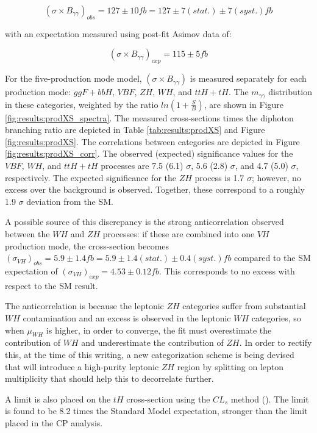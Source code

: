 \begin{equation}
(\sigma \times B_{\gamma \gamma})_{obs} =127 \pm 10 fb=127 \pm 7(stat.) \pm 7(syst.)fb
\end{equation}

with an expectation measured using post-fit Asimov data of:

\begin{equation}
(\sigma \times B_{\gamma \gamma})_{exp} =115 \pm 5 fb
\end{equation}

For the five-production mode model, $(\sigma \times B_{\gamma \gamma})$ is measured separately for each production mode: $ggF+bbH$, $VBF$, $ZH$, $WH$, and $ttH+tH$. The $m_{\gamma\gamma}$ distribution in these categories, weighted by the ratio $ln(1+\frac{S}{B})$, are shown in Figure \ref{fig:results:prodXS_spectra}. The measured cross-sections times the diphoton branching ratio are depicted in Table \ref{tab:results:prodXS} and Figure \ref{fig:results:prodXS}. The correlations between categories are depicted in Figure \ref{fig:results:prodXS_corr}. The observed (expected) significance values for the $VBF$, $WH$, and $ttH+tH$ processes are 7.5 (6.1) $\sigma$, 5.6 (2.8) $\sigma$, and 4.7 (5.0) $\sigma$, respectively. The expected significance for the $ZH$ process is 1.7 $\sigma$; however, no excess over the background is observed. Together, these correspond to a roughly 1.9 $\sigma$ deviation from the SM.

A possible source of this discrepancy is the strong anticorrelation observed between the $WH$ and $ZH$ processes: if these are combined into one $VH$ production mode, the cross-section becomes $(\sigma_{VH})_{obs} = 5.9 \pm 1.4fb = 5.9 \pm 1.4(stat.) \pm 0.4(syst.)fb$ compared to the SM expectation of $(\sigma_{VH})_{exp}=4.53 \pm 0.12fb$. This corresponds to no excess with respect to the SM result.

The anticorrelation is because the leptonic $ZH$ categories suffer from substantial $WH$ contamination and an excess is observed in the leptonic $WH$ categories, so when $\mu_{WH}$ is higher, in order to converge, the fit must overestimate the contribution of $WH$ and underestimate the contribution of $ZH$. In order to rectify this, at the time of this writing, a new categorization scheme is being devised that will introduce a high-purity leptonic $ZH$ region by splitting on lepton multiplicity that should help this to decorrelate further.

A limit is also placed on the $tH$ cross-section using the $CL_{s}$ method (\cite{CLs}). The limit is found to be 8.2 times the Standard Model expectation, stronger than the limit placed in the CP analysis. 


